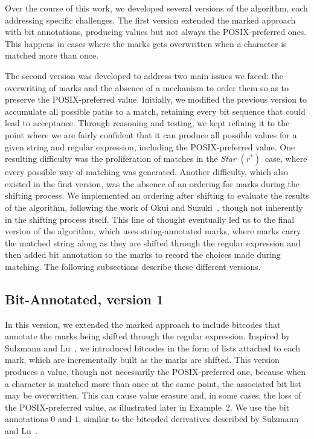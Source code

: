 \documentclass[12pt]{article}
\newcommand{\STARText}{\textit{Star} $(r^*)$}
\begin{document}
Over the course of this work, we developed several versions of the algorithm, each addressing specific challenges.  
The first version extended the marked approach with bit annotations, producing values but not always the POSIX-preferred ones. 
This happens in cases where the marks gets overwritten when a character is matched more than once.

The second version was developed to address two main issues we faced: the overwriting of marks and the absence of a mechanism to order them 
so as to preserve the POSIX-preferred value. Initially, we modified the previous version to accumulate all possible paths to a match, retaining 
every bit sequence that could lead to acceptance. Through reasoning and testing, we kept refining it to the point where we are fairly confident 
that it can produce all possible values for a given string and regular expression, including the POSIX-preferred value.  
One resulting difficulty was the proliferation of matches in the \STARText\ case, where every possible way of matching was generated.  
Another difficulty, which also existed in the first version, was the absence of an ordering for marks during the shifting process.  
We implemented an ordering after shifting to evaluate the results of the algorithm, following the work of Okui and Suzuki~\cite{OkuiSuzuki2013}, 
though not inherently in the shifting process itself. This line of thought eventually led us to the final version of the algorithm, which uses 
string-annotated marks, where marks carry the matched string along as they are shifted through the regular expression and then added bit annotation to the marks
to record the choices made during matching.
The following subsections describe these different versions.

\subsection{Bit-Annotated, version 1}

In this version, we extended the marked approach to include bitcodes that annotate the marks being 
shifted through the regular expression. Inspired by Sulzmann and Lu~\cite{Sulzmann2014}, we introduced bitcodes in the form 
of lists attached to each mark, which are incrementally built as the marks are shifted.  
This version produces a value, though not necessarily the POSIX-preferred one, because when a character is matched 
more than once at the same point, the associated bit list may be overwritten.  
This can cause value erasure and, in some cases, the loss of the POSIX-preferred value, as illustrated later in Example~2.  
We use the bit annotations $0$ and $1$, similar to the bitcoded derivatives described by Sulzmann and Lu~\cite{Sulzmann2014}.  
\end{document}
